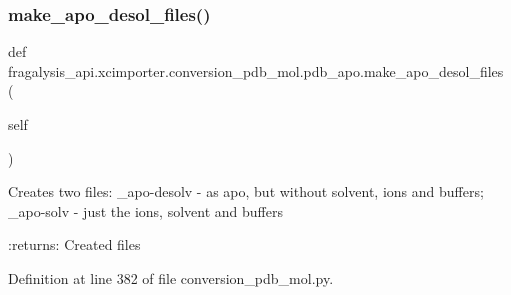 \subsubsection{\texorpdfstring{make\+\_\+apo\+\_\+desol\+\_\+files()}{make\_apo\_desol\_files()}}
{\footnotesize\ttfamily def fragalysis\+\_\+api.\+xcimporter.\+conversion\+\_\+pdb\+\_\+mol.\+pdb\+\_\+apo.\+make\+\_\+apo\+\_\+desol\+\_\+files (\begin{DoxyParamCaption}\item[{}]{self }\end{DoxyParamCaption})}

\begin{DoxyVerb}Creates two files:
_apo-desolv - as apo, but without solvent, ions and buffers;
_apo-solv - just the ions, solvent and buffers

:returns: Created files
\end{DoxyVerb}
 

Definition at line 382 of file conversion\+\_\+pdb\+\_\+mol.\+py.


